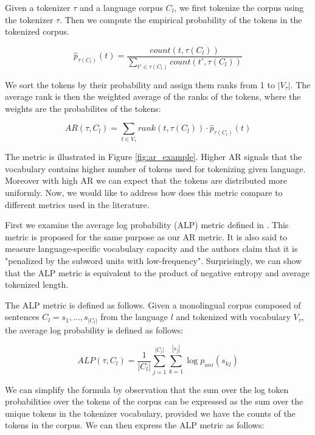 Given a tokenizer $\tau$ and a language corpus $C_l$, we first tokenize the corpus using the tokenizer $\tau$. Then we compute the empirical probability of the tokens in the tokenized corpus.

\begin{equation}
    \hat{p}_{\tau(C_l)}(t) = \frac{count(t, \tau(C_l))}{\sum_{t' \in \tau(C_l)} count(t', \tau(C_l))}
\end{equation}

We sort the tokens by their probability and assign them ranks from 1 to $|V_\tau|$. The average rank is then the weighted average of the ranks of the tokens, where the weights are the probabilites of the tokens:

\begin{equation}
    AR(\tau, C_l) = \sum_{t \in V_\tau} rank(t, \tau(C_l)) \cdot \hat{p}_{\tau(C_l)}(t)
\end{equation}

The metric is illustrated in Figure \ref{fig:ar_example}. Higher AR signals that the vocabulary contains higher number of tokens used for tokenizing given language. Moreover with high AR we can expect that the tokens are distributed more uniformly.
 Now, we would like to address how does this metric compare to different metrics used in the literature. 

First we examine the average log probability (ALP) metric defined in \citet{zheng_allocating_2021}. This metric is proposed for the same purpose as our AR metric. It is also said to measure language-specific vocabulary capacity and the authors claim that it is "penalized by the subword units with low-frequency". Surprisingly, we can show that the ALP metric is equivalent to the product of negative entropy and average tokenized length.

The ALP metric is defined as follows. Given a monolingual corpus composed of sentences $C_l = {s_1, ..., s_{|C_l|}}$ from the language $l$ and tokenized with vocabulary $V_\tau$, the average log probability is defined as follows:

\begin{equation}
    ALP(\tau, C_l) = \frac{1}{|C_l|} \sum_{j=1}^{|C_l|} \sum_{k=1}^{|s_j|} \log p_{uni}(s_{kj})
\end{equation}

We can simplify the formula by observation that the sum over the log token probabilities over the tokens of the corpus can be expressed as the sum over the unique tokens in the tokenizer vocabulary, provided we have the counts of the tokens in the corpus. We can then express the ALP metric as follows: 

